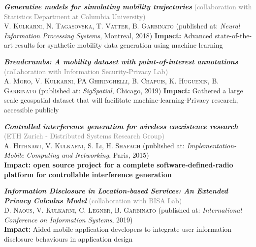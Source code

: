 
\begin{itemize}[leftmargin=*]

    \small{

    \item \textbf{\textit{Generative models for simulating mobility trajectories}} \textcolor{gray}{(collaboration with Statistics Department at Columbia University)}\\
    \textsc{V. Kulkarni, N. Tagasovska, T. Vatter, B. Garbinato} (published at: \textit{Neural Information Processing Systems}, Montreal, 2018)
    \textbf{Impact:} Advanced state-of-the-art results for synthetic mobility data generation using machine learning
    
   
    
    \item \textbf{\textit{Breadcrumbs: A mobility dataset with point-of-interest annotations}} \textcolor{gray}{(collaboration with Information Security-Privacy  Lab)}\\
    \textsc{A. Moro, V. Kulkarni, PA Ghiringhelli, B. Chapuis, K. Huguenin, B. Garbinato} (published at: \textit{SigSpatial}, Chicago, 2019)
    \textbf{Impact:} Gathered a large scale geospatial dataset that will facilitate machine-learning-Privacy research, accessible publicly 
   
   
    \item \textbf{\textit{Controlled interference generation for wireless coexistence research}} \textcolor{gray}{(ETH Zurich - Distributed Systems Research Group)}\\
    \textsc{A. Hithnawi, V. Kulkarni, S. Li, H. Shafagh} (published at: \textit{Implementation-Mobile Computing and Networking}, Paris, 2015)\\
    \textbf{Impact: open source project for a complete software-defined-radio platform for controllable interference generation}   
    

    \item \textbf{\textit{Information Disclosure in Location-based Services: An Extended Privacy Calculus Model}} \textcolor{gray}{(collaboration with BISA Lab)}\\
    \textsc{D. Naous, V. Kulkarni, C. Legner, B. Garbinato} (published at: \textit{International Conference on Information Systems}, 2019)\\
    \textbf{Impact:} Aided mobile application developers to integrate user information disclosure behaviours in application design\\

}
\end{itemize}
